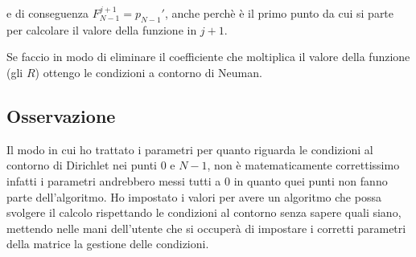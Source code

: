 e di conseguenza $F_{N-1}^{j+1} = p_{N-1}'$, anche perch\`e \`e il primo punto da cui si parte per calcolare il valore della funzione in $j+1$.

Se faccio in modo di eliminare il coefficiente che moltiplica il valore della funzione (gli $R$) ottengo le condizioni a  contorno di Neuman.
\subsection{Osservazione}
Il modo in cui ho trattato i parametri per quanto riguarda le condizioni al contorno di Dirichlet nei punti $0$ e $N-1$, non \`e matematicamente correttissimo infatti i parametri andrebbero messi tutti a 0 in quanto quei punti non fanno parte dell'algoritmo. Ho impostato i valori  per avere un algoritmo che possa svolgere il calcolo rispettando le condizioni al contorno senza sapere quali siano, mettendo nelle mani dell'utente che si occuper\`a di impostare i corretti parametri della matrice la gestione delle condizioni.